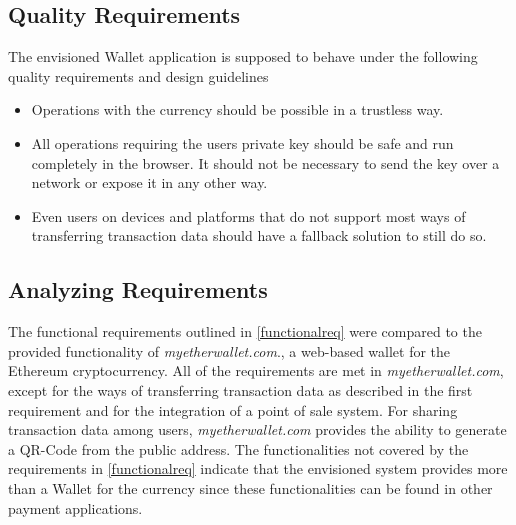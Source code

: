 \subsection{Quality Requirements}
The envisioned Wallet application is supposed to behave under the following quality requirements and design guidelines %
\begin{itemize}
\item Operations with the currency should be possible in a trustless way.
\item All operations requiring the users private key should be safe and run completely in the browser. It should not be necessary to send the key over a network or expose it in any other way.
\item Even users on devices and platforms that do not support most ways of transferring transaction data should have a fallback solution to still do so.

\end{itemize}
\subsection{Analyzing Requirements}

The functional requirements outlined in \ref{functionalreq} were compared to%
the provided functionality of \textit{myetherwallet.com}., a web-based wallet for the Ethereum cryptocurrency. All of the requirements are met in \textit{myetherwallet.com}, except for the ways of transferring transaction data as described in the first requirement and for the integration of a point of sale system. For sharing transaction data among users, \textit{myetherwallet.com} provides the ability to generate a QR-Code from the public address. The functionalities not covered by the requirements in \ref{functionalreq} indicate that the envisioned system provides more than a Wallet for the currency since these functionalities can be found in other payment applications.
